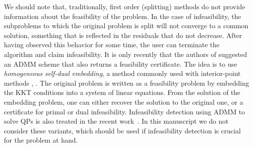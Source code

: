 \documentclass[openany]{now}
\begin{document}
We should note that, traditionally, first order (splitting) methods do not provide information about the feasibility of the problem. In the case of infeasibility, the subproblems to which the original problem is split will not converge to a common solution, something that is reflected in the residuals that do not decrease. After having observed this behavior for some time, the user can terminate the algorithm and claim infeasibility. It is only recently that the authors of \cite{o2013operator} suggested an ADMM scheme that also returns a feasibility certificate. The idea is to use \emph{homogeneous self-dual embedding}, a method commonly used with interior-point methods \cite{ye1994nl}, \cite{Xu96asimplified}. The original problem is written as a feasibility problem by embedding the KKT conditions into a system of linear equations. From the solution of the embedding problem, one can either recover the solution to the original one, or a certificate for primal or dual infeasibility. Infeasibility detection using ADMM to solve QPs is also treated in the recent work~\cite{raghunathan2014infeasibility}. In this manuscript we do not consider these variants, which should be used if infeasibility detection is crucial for the problem at hand.
\end{document}
